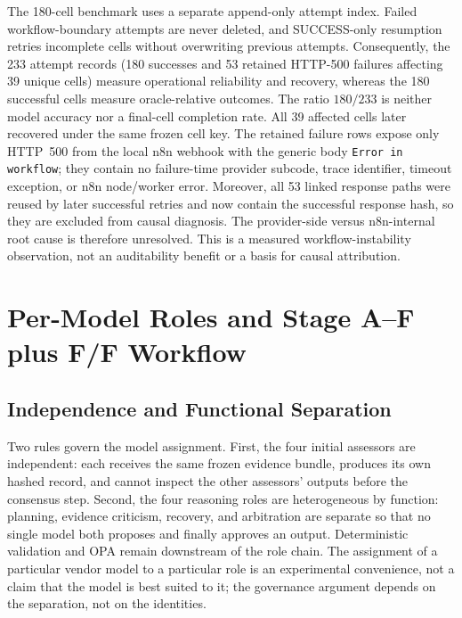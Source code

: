 \documentclass[journal]{IEEEtran}
\begin{document}
The 180-cell benchmark uses a separate append-only attempt index. Failed
workflow-boundary attempts are never deleted, and SUCCESS-only resumption
retries incomplete cells without overwriting previous attempts. Consequently,
the 233 attempt records (180 successes and 53 retained HTTP-500 failures
affecting 39 unique cells) measure operational reliability and recovery,
whereas the 180 successful cells measure oracle-relative outcomes. The ratio
$180/233$ is neither model accuracy nor a final-cell completion rate. All
39 affected cells later recovered under the same frozen cell key. The retained
failure rows expose only HTTP~500 from the local n8n webhook with the generic
body \texttt{Error in workflow}; they contain no failure-time provider
subcode, trace identifier, timeout exception, or n8n node/worker error.
Moreover, all 53 linked response paths were reused by later successful retries
and now contain the successful response hash, so they are excluded from causal
diagnosis. The provider-side versus n8n-internal root cause is therefore
unresolved. This is a measured workflow-instability observation, not an
auditability benefit or a basis for causal attribution.

\section{Per-Model Roles and Stage A--F plus F/F Workflow}
\label{sec:roles}

\subsection{Independence and Functional Separation}
Two rules govern the model assignment. First, the four initial assessors are
independent: each receives the same frozen evidence bundle, produces its own
hashed record, and cannot inspect the other assessors' outputs before the
consensus step. Second, the four reasoning roles are heterogeneous by
function: planning, evidence criticism, recovery, and arbitration are
separate so that no single model both proposes and finally approves an
output. Deterministic validation and OPA remain downstream of the role chain.
The assignment of a particular vendor model to a particular role is an
experimental convenience, not a claim that the model is best suited to it; the
governance argument depends on the separation, not on the identities.
\end{document}

